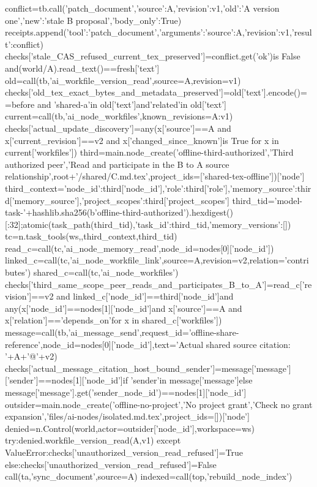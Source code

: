     conflict=tb.call('patch_document',{'source':A,'revision':v1,'old':'A version one','new':'stale B proposal','body_only':True})
    receipts.append({'tool':'patch_document','arguments':{'source':A,'revision':v1},'result':conflict})
    checks['stale_CAS_refused_current_tex_preserved']=conflict.get('ok')is False and(world/A).read_text()==fresh['text']
    old=call(tb,'ai_workfile_version_read',source=A,revision=v1)
    checks['old_tex_exact_bytes_and_metadata_preserved']=old['text'].encode()==before and 'shared-a'in old['text']and'related'in old['text']
    current=call(tb,'ai_node_workfiles',known_revisions={A:v1})
    checks['actual_update_discovery']=any(x['source']==A and x['current_revision']==v2 and x['changed_since_known']is True for x in current['workfiles'])
    third=main.node_create('offline-third-authorized','Third authorized peer','Read and participate in the B to A source relationship',root+'/shared/C.md.tex',project_ids=['shared-tex-offline'])['node']
    third_context={'node_id':third['node_id'],'role':third['role'],'memory_source':third['memory_source'],'project_scopes':third['project_scopes']}
    third_tid='model-task-'+hashlib.sha256(b'offline-third-authorized').hexdigest()[:32];atomic(task_path(third_tid),{'task_id':third_tid,'memory_versions':[]})
    tc=n.task_tools(ws,{},third_context,third_tid)
    read_c=call(tc,'ai_node_memory_read',node_id=nodes[0]['node_id'])
    linked_c=call(tc,'ai_node_workfile_link',source=A,revision=v2,relation='contributes')
    shared_c=call(tc,'ai_node_workfiles')
    checks['third_same_scope_peer_reads_and_participates_B_to_A']=read_c['revision']==v2 and linked_c['node_id']==third['node_id']and any(x['node_id']==nodes[1]['node_id']and x['source']==A and x['relation']=='depends_on'for x in shared_c['workfiles'])
    message=call(tb,'ai_message_send',request_id='offline-share-reference',node_id=nodes[0]['node_id'],text='Actual shared source citation: '+A+'@'+v2)
    checks['actual_message_citation_host_bound_sender']=message['message']['sender']==nodes[1]['node_id']if 'sender'in message['message']else message['message'].get('sender_node_id')==nodes[1]['node_id']
    outsider=main.node_create('offline-no-project','No project grant','Check no grant expansion','files/ai-nodes/isolated.md.tex',project_ids=[])['node']
    denied=n.Control(world,actor=outsider['node_id'],workspace=ws)
    try:denied.workfile_version_read(A,v1)
    except ValueError:checks['unauthorized_version_read_refused']=True
    else:checks['unauthorized_version_read_refused']=False
    call(ta,'sync_document',source=A)
    indexed=call(top,'rebuild_node_index')
